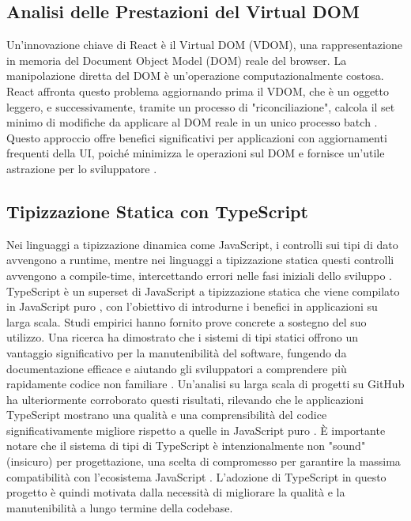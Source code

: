 \documentclass[12pt,a4paper,openright,twoside]{book}
\begin{document}
\subsection{Analisi delle Prestazioni del Virtual DOM}
Un'innovazione chiave di React è il Virtual DOM (VDOM), una rappresentazione in memoria del Document Object Model (DOM) reale del browser. La manipolazione diretta del DOM è un'operazione computazionalmente costosa. React affronta questo problema aggiornando prima il VDOM, che è un oggetto leggero, e successivamente, tramite un processo di "riconciliazione", calcola il set minimo di modifiche da applicare al DOM reale in un unico processo batch \cite{chen2019performance}. Questo approccio offre benefici significativi per applicazioni con aggiornamenti frequenti della UI, poiché minimizza le operazioni sul DOM e fornisce un'utile astrazione per lo sviluppatore \cite{chen2019performance}.

\subsection{Tipizzazione Statica con TypeScript}
Nei linguaggi a tipizzazione dinamica come JavaScript, i controlli sui tipi di dato avvengono a runtime, mentre nei linguaggi a tipizzazione statica questi controlli avvengono a compile-time, intercettando errori nelle fasi iniziali dello sviluppo \cite{mayerTyping}. TypeScript è un superset di JavaScript a tipizzazione statica che viene compilato in JavaScript puro \cite{bierman2014understanding}, con l'obiettivo di introdurne i benefici in applicazioni su larga scala. Studi empirici hanno fornito prove concrete a sostegno del suo utilizzo. Una ricerca ha dimostrato che i sistemi di tipi statici offrono un vantaggio significativo per la manutenibilità del software, fungendo da documentazione efficace e aiutando gli sviluppatori a comprendere più rapidamente codice non familiare \cite{hanenberg2014empirical}. Un'analisi su larga scala di progetti su GitHub ha ulteriormente corroborato questi risultati, rilevando che le applicazioni TypeScript mostrano una qualità e una comprensibilità del codice significativamente migliore rispetto a quelle in JavaScript puro \cite{Bogner_2022}. È importante notare che il sistema di tipi di TypeScript è intenzionalmente non "sound" (insicuro) per progettazione, una scelta di compromesso per garantire la massima compatibilità con l'ecosistema JavaScript \cite{bierman2014understanding}. L'adozione di TypeScript in questo progetto è quindi motivata dalla necessità di migliorare la qualità e la manutenibilità a lungo termine della codebase.
\end{document}
